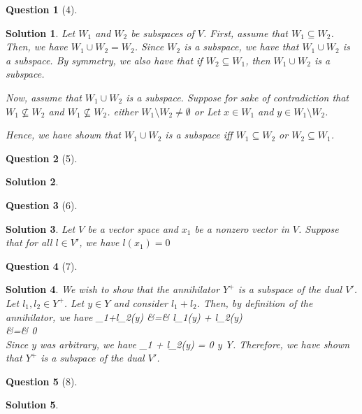 \documentclass{article} %
\def\eQb#1\eQe{\begin{eqnarray*}#1\end{eqnarray*}}
\theoremstyle{quest}
\newtheorem*{question}{Question}
\newtheorem*{solution}{Solution}
\begin{document}
\bigskip

\begin{question}[4]
\end{question}
\begin{solution}
Let $W_1$ and $W_2$ be subspaces of $V$. First, assume that
$W_1 \subseteq W_2$. Then, we have $W_1 \cup W_2 = W_2$. Since
$W_2$ is a subspace, we have that $W_1 \cup W_2$ is a subspace. By symmetry, we also have that if $W_2 \subseteq W_1$, then $W_1 \cup W_2$ is a subspace.

\smallskip

Now, assume that $W_1 \cup W_2$ is a subspace. 
Suppose for sake of contradiction that $W_1 \nsubseteq W_2$ and
$W_1 \nsubseteq W_2$. 
either $W_1 \setminus W_2 \neq \emptyset$ or  
Let $x \in W_1$ and $y \in W_1 \setminus W_2$.


Hence, we have shown that $W_1 \cup W_2$ is a subspace iff $W_1 \subseteq W_2$
or $W_2 \subseteq W_1$.  

\end{solution}

\bigskip

\begin{question}[5]
\end{question}
\begin{solution}
\end{solution}

\bigskip

\begin{question}[6]
\end{question}
\begin{solution}
Let $V$ be a vector space and $x_1$ be a nonzero vector in $V$.
Suppose that for all $l \in V'$, we have
$l(x_1) = 0$ 
\end{solution}

\bigskip

\begin{question}[7]
\end{question}
\begin{solution}
We wish to show that the annihilator $Y^{+}$ is a subspace of the dual $V'$.
Let $l_1 , l_2 \in Y^{+}$. Let $y \in Y$ and consider $l_1 + l_2$.
Then, by definition of the annihilator, we have
\eQb
l_1+l_2(y) &=& l_1(y) + l_2(y) \\ 
&=& 0 \\
\eQe 
Since $y$ was arbitrary, we have 
\eQb
l_1 + l_2(y) = 0 \forall y \in Y. 
\eQe
Therefore, we have shown that $Y^{+}$ is a subspace of the dual $V'$.
\end{solution}

\bigskip

\begin{question}[8]
\end{question}
\begin{solution}
\end{solution}
\end{document}
